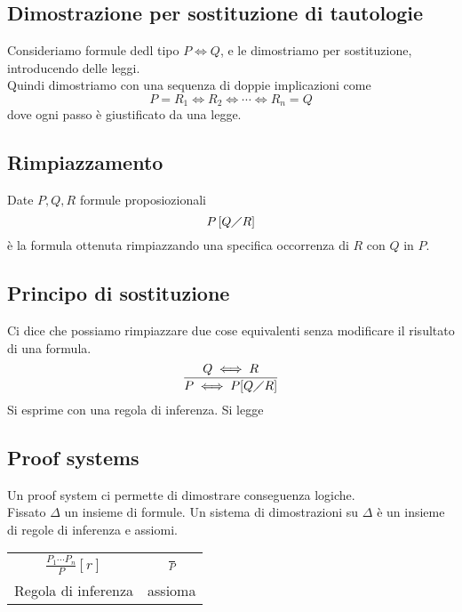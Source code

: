 \documentclass{article}
\begin{document}
\subsection*{Dimostrazione per sostituzione di tautologie}
Consideriamo formule dedl tipo \(P \iff Q\), e le dimostriamo per sostituzione, introducendo delle leggi. \\
Quindi dimostriamo con una sequenza di doppie implicazioni come
\[P = R_1 \Leftrightarrow R_2 \Leftrightarrow \cdots \Leftrightarrow R_n = Q\]
dove ogni passo è giustificato da una legge.
\subsection*{Rimpiazzamento}
Date \(P, Q, R\) formule proposiozionali
\[P\left[Q \diagup R\right]\]
è la formula ottenuta rimpiazzando una specifica occorrenza di \(R\) con \(Q\) in \(P\).
\subsection*{Principo di sostituzione}
Ci dice che possiamo rimpiazzare due cose equivalenti senza modificare il risultato di una formula.
\[
    \frac
    {Q \iff R}
    {P \iff P[Q \diagup R]}
\]
Si esprime con una regola di inferenza. Si legge 

\subsection{Proof systems}
Un proof system ci permette di dimostrare conseguenza logiche. \\
Fissato \(\Delta\) un insieme di formule. Un sistema di dimostrazioni su \(\Delta\) è un insieme di regole di inferenza e assiomi.
\begin{center}
    \begin{tabular}{cc}
        \(\displaystyle \frac{P_1 \cdots P_n}{P}[r]\) & \(\frac{}{P}\) \\
        Regola di inferenza                           & assioma
    \end{tabular}
\end{center}
\end{document}
